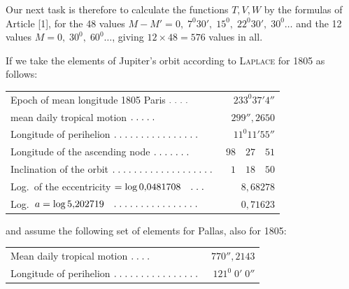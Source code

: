 \begin{landscape}
\par\noindent\hspace*{\parindent}Our next task is therefore to calculate the functions \(T,V,W\) by the formulas of Article [1], for the 48 values \(M-M'=0,\;7^0 30',\;15^0,\;22^0 30',\;30^0\ldots\) and the 12 values \(M=0,\;30^0,\;60^0\ldots\), giving \(12\times48=576\) values in all.
\par\noindent\edef\VSixSavedIndent{\the\parindent}\begin{minipage}{\linewidth}\setlength{\parindent}{\VSixSavedIndent}
\par\noindent\hspace*{\parindent}If we take the elements of Jupiter's orbit according to \textsc{Laplace} for 1805 as follows:
\begin{center}
\begin{tabular}{@{}l@{\quad}r@{}}
Epoch of mean longitude 1805 Paris \(\VSixPoint\VSixPoint\VSixPoint\VSixPoint\)&\(233^0 37'4''\)\\
mean daily tropical motion \(\VSixPoint\VSixPoint\VSixPoint\VSixPoint\VSixPoint\)&\(299''{,}2650\)\\
Longitude of perihelion \(\VSixTenPoints\VSixPoint\VSixPoint\VSixPoint\VSixPoint\VSixPoint\VSixPoint\)&\(11^0 11'55''\)\\
Longitude of the ascending node \(\VSixPoint\VSixPoint\VSixPoint\VSixPoint\VSixPoint\VSixPoint\VSixPoint\)&\(98\quad27\quad51\)\\
Inclination of the orbit \(\VSixTenPoints\VSixPoint\VSixPoint\VSixPoint\VSixPoint\VSixPoint\VSixPoint\VSixPoint\VSixPoint\VSixPoint\)&\(1\quad18\quad50\)\\
Log.\ of the eccentricity \(=\log0{,}0481708\quad\VSixPoint\VSixPoint\VSixPoint\)&\(8{,}68278\)\\
Log.\ \(a=\log5{,}202719\quad\VSixTenPoints\VSixPoint\VSixPoint\VSixPoint\VSixPoint\VSixPoint\VSixPoint\)&\(0{,}71623\)
\end{tabular}
\end{center}
\end{minipage}\par
\noindent and assume the following set of elements for Pallas, also for 1805:
\begin{center}
\begin{tabular}{@{}l@{\quad}r@{}}
Mean daily tropical motion \(\VSixPoint\VSixPoint\VSixPoint\VSixPoint\)&\(770''{,}2143\)\\
Longitude of perihelion \(\VSixTenPoints\VSixPoint\VSixPoint\VSixPoint\VSixPoint\VSixPoint\VSixPoint\)&\(121^0\;0'\;0''\)\\

\end{tabular}
\end{center}
\end{landscape}
